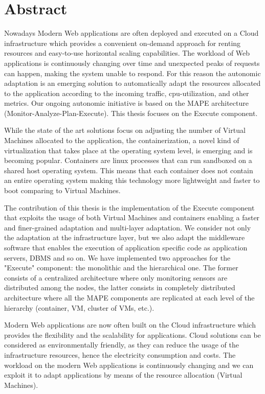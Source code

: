 \newpage
\chapter*{Abstract}


Nowadays Modern Web applications are often deployed and executed on a Cloud infrastructure which provides a convenient on-demand approach for renting resources and easy-to-use horizontal scaling capabilities. The workload of Web applications is continuously changing over time and unexpected peaks of requests can happen, making the system unable to respond. For this reason the autonomic adaptation is an emerging solution to automatically adapt the resources allocated to the application according to the incoming traffic, cpu-utilization, and other metrics. Our ongoing autonomic initiative is based on the MAPE architecture (Monitor-Analyze-Plan-Execute). This thesis focuses on the Execute component. 

While the state of the art solutions focus on adjusting the number of Virtual Machines allocated to the application, the containerization, a novel kind of virtualization that takes place at the operating system level, is emerging and is becoming popular. Containers are linux processes that can run sandboxed on a shared host operating system. This means that each container does not contain an entire operating system making this technology more lightweight and faster to boot comparing to Virtual Machines.

The contribution of this thesis is the implementation of the Execute component that exploits the usage of both Virtual Machines and containers enabling a faster and finer-grained adaptation and multi-layer adaptation. We consider not only the adaptation at the infrastructure layer, but we also adapt the middleware software that enables the execution of application specific code as application servers, DBMS and so on. We have implemented two approaches for the "Execute" component: the monolithic and the hierarchical one. The former consists of a centralized architecture where only monitoring sensors are distributed among the nodes, the latter consists in completely distributed architecture where all the MAPE components are replicated at each level of the hierarchy (container, VM, cluster of VMs, etc.).

\ifx
Modern Web applications are now often built on the Cloud infrastructure which provides the flexibility and the scalability for applications. Cloud solutions can be considered as environmentally friendly, as they can reduce the usage of the infrastructure resources, hence the electricity consumption and costs. The workload on the modern Web applications is continuously changing and we can exploit it to adapt applications by means of the resource allocation (Virtual Machines).

